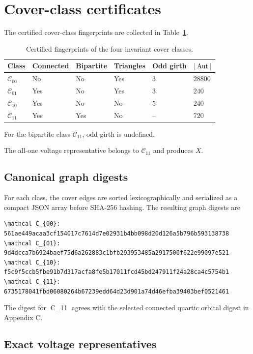 \section{Cover-class certificates}

The certified cover-class fingerprints are collected in
Table~\ref{tab:cover-class-certificates}.

\begin{table}[h]
\centering
\begin{tabular}{llllll}
\toprule
Class &
Connected &
Bipartite &
Triangles &
Odd girth &
\(|\operatorname{Aut}|\)\\
\midrule
\(\mathcal C_{00}\) & No  & No  & Yes & \(3\) & \(28800\)\\
\(\mathcal C_{01}\) & Yes & No  & Yes & \(3\) & \(240\)\\
\(\mathcal C_{10}\) & Yes & No  & No  & \(5\) & \(240\)\\
\(\mathcal C_{11}\) & Yes & Yes & No  & --    & \(720\)\\
\bottomrule
\end{tabular}
\caption{Certified fingerprints of the four invariant cover classes.}
\label{tab:cover-class-certificates}
\end{table}

For the bipartite class \(\mathcal C_{11}\), odd girth is undefined.

The all-one voltage representative belongs to \(\mathcal C_{11}\) and
produces \(X\).

\subsection{Canonical graph digests}

For each class, the cover edges are sorted lexicographically and serialized
as a compact JSON array before SHA-256 hashing. The resulting graph digests
are

\begin{verbatim}
\mathcal C_{00}: 561ae449acaa3cf154017c7614d7e02931b4bb098d20d126a5b796b593138738
\mathcal C_{01}: 9d4dcca7b6924baef75d6a262883c1bfb293953485a2917500f622e99097e521
\mathcal C_{10}: f5c9f5ccb5fbe91b7d317acfa8fe5b17011fcd45bd247911f24a28ca4c5754b1
\mathcal C_{11}: 6735178041fbd06080264b67239edd64d23d901a74d46efba39403bef0521461
\end{verbatim}

The digest for \mathcal C_{11} agrees with the selected connected
quartic orbital digest in Appendix C.

\subsection{Exact voltage representatives}

